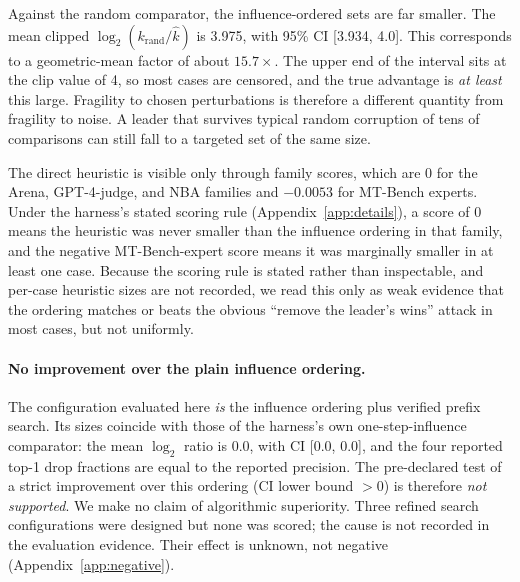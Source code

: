\documentclass{article}
\newcommand{\kver}{\hat{k}}
\begin{document}
Against the random comparator, the influence-ordered sets are far smaller. The mean clipped $\log_2(k_{\text{rand}}/\kver)$ is 3.975, with 95\% CI [3.934, 4.0]. This corresponds to a geometric-mean factor of about $15.7\times$. The upper end of the interval sits at the clip value of 4, so most cases are censored, and the true advantage is \emph{at least} this large. Fragility to chosen perturbations is therefore a different quantity from fragility to noise. A leader that survives typical random corruption of tens of comparisons can still fall to a targeted set of the same size.

The direct heuristic is visible only through family scores, which are 0 for the Arena, GPT-4-judge, and NBA families and $-0.0053$ for MT-Bench experts. Under the harness's stated scoring rule (Appendix~\ref{app:details}), a score of 0 means the heuristic was never smaller than the influence ordering in that family, and the negative MT-Bench-expert score means it was marginally smaller in at least one case. Because the scoring rule is stated rather than inspectable, and per-case heuristic sizes are not recorded, we read this only as weak evidence that the ordering matches or beats the obvious ``remove the leader's wins'' attack in most cases, but not uniformly.

\paragraph{No improvement over the plain influence ordering.}
The configuration evaluated here \emph{is} the influence ordering plus verified prefix search. Its sizes coincide with those of the harness's own one-step-influence comparator: the mean $\log_2$ ratio is 0.0, with CI [0.0, 0.0], and the four reported top-1 drop fractions are equal to the reported precision. The pre-declared test of a strict improvement over this ordering (CI lower bound $>0$) is therefore \emph{not supported}. We make no claim of algorithmic superiority. Three refined search configurations were designed but none was scored; the cause is not recorded in the evaluation evidence. Their effect is unknown, not negative (Appendix~\ref{app:negative}).
\end{document}
